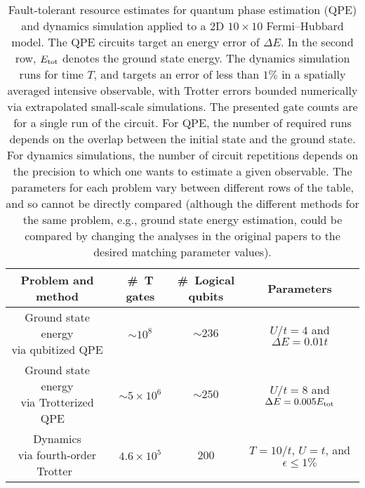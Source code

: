 \begin{refsection}
\begin{table}[!ht]
    \centering
    \begin{adjustbox}{max width=\textwidth}
    \begin{tabular}{c|c|c|c}
        \textbf{Problem and method}  & \textbf{\#~T %
        gates} & \makecell{ \textbf{\#~Logical} \\ \textbf{qubits}}  & \textbf{Parameters} \\ \hline\hline
        \makecell{Ground state energy \\ via qubitized QPE \cite{babbush2018EncodingElectronicSpectraLinearT, yoshioka2022CondensedMatterSimulation} } &  $\sim 10^8$ & $\sim 236$ & $U/t=4$ and $\Delta E = 0.01t$\\ \hline
        \makecell{Ground state energy \\ via Trotterized QPE ~\cite{CampbellHubbard22, Kivlichan2020ImprovedFaultTolerantSimulationCondensedMatter}  }  &   $\sim 5 \times 10^6$
        & $\sim 250$
         & $U/t = 8$ and $\Delta E = 0.005 E_{\rm tot}$
        \\ \hline
        \makecell{Dynamics \\ via fourth-order Trotter~\cite{flannigan2022} } &  $4.6\times 10^5$  & 200 & $T=10/t$, $U=t$, and $\epsilon \leq 1\%$ \\
    \end{tabular}
    \end{adjustbox}
    \caption{Fault-tolerant resource estimates for quantum phase estimation (QPE) and dynamics simulation applied to a 2D $10\times 10$ Fermi--Hubbard model. The QPE circuits target an energy error of $\Delta E$. In the second row, $E_{\rm tot}$ denotes the ground state energy. The dynamics simulation runs for time $T$, and targets an error of less than $1\%$ in a spatially averaged intensive observable, with Trotter errors bounded numerically via extrapolated small-scale simulations. The presented gate counts are for a single run of the circuit. For QPE, the number of required runs depends on the overlap between the initial state and the ground state. For dynamics simulations, the number of circuit repetitions depends on the precision to which one wants to estimate a given observable. The parameters for each problem vary between different rows of the table, and so cannot be directly compared (although the different methods for the same problem, e.g., ground state energy estimation, could be compared by changing the analyses in the original papers to the desired matching parameter values).
    }
    \label{Tab:ResourceEst_FermiHubbard}
\end{table}





\end{refsection}
